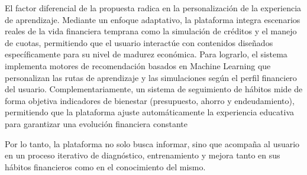 El factor diferencial de la propuesta radica en la personalización de la experiencia de aprendizaje. Mediante un enfoque adaptativo, la plataforma integra escenarios reales de la vida financiera temprana como la simulación de créditos y el manejo de cuotas, permitiendo que el usuario interactúe con contenidos diseñados específicamente para su nivel de madurez económica. Para lograrlo, el sistema implementa motores de recomendación basados en Machine Learning que personalizan las rutas de aprendizaje y las simulaciones según el perfil financiero del usuario. Complementariamente, un sistema de seguimiento de hábitos mide de forma objetiva indicadores de bienestar (presupuesto, ahorro y endeudamiento), permitiendo que la plataforma ajuste automáticamente la experiencia educativa para garantizar una evolución financiera constante

Por lo tanto, la plataforma no solo busca informar, sino que acompaña al usuario en un proceso iterativo de diagnóstico, entrenamiento y mejora tanto en sus hábitos financieros como en el conocimiento del mismo.